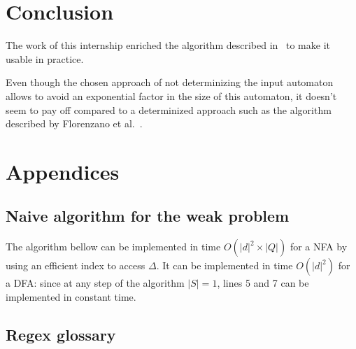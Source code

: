 \documentclass[12px]{article}
\theoremstyle{definition}
\newcommand{\Span}[1]{\left[ #1 \right\rangle}
\begin{document}


  \section{Conclusion}

    The work of this internship enriched the algorithm described
    in~\cite{ICDT19} to make it usable in practice.

    Even though the chosen approach of not determinizing the input automaton
    allows to avoid an exponential factor in the size of this automaton, it
    doesn't seem to pay off compared to a determinized approach such as the
    algorithm described by Florenzano et al.~\cite{florenzano2018constant}.

  \pagebreak
  
  


  \pagebreak
  \section*{Appendices}


    \subsection{Naive algorithm for the weak problem}

      The algorithm bellow can be implemented in time $O(|d|^2 \times |Q|)$ for
      a NFA by using an efficient index to access $\Delta$. It can be
      implemented in time $O(|d|^2)$ for a DFA\@: since at any step of the
      algorithm $|S| = 1$, lines 5 and 7 can be implemented in constant time.

      \begin{algorithm}[H]%
        \label{alg:naive}
        \begin{algorithmic}[1]
                \State{%
                  $\texttt{output} \gets \texttt{output} \uplus \{\Span{i,
                  j}\}$
                }
              \EndIf{}
            \EndFor{}
          \EndFor{}
        \end{algorithmic}
        \caption{%
          A naive quadratic algorithm for Problem~\ref{pb:weak} with inputs
          $\mathcal{A} = (Q, q_\text{init}, \Delta, F)$ and $d \in \Sigma^*$
        }
      \end{algorithm}

    \subsection{Regex glossary}%
      \label{sec:regex_glossary}
\end{document}
